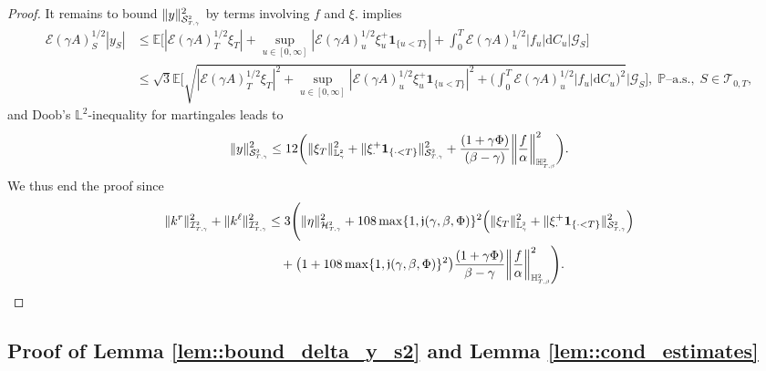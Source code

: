 \documentclass[10pt]{article} %
\newcommand\cE{\mathcal E}
\newcommand\cG{\mathcal G}
\newcommand\cH{\mathcal H}
\newcommand\cI{\mathcal I}
\newcommand\cS{\mathcal S}
\newcommand\cT{\mathcal T}
\newcommand{\smalltext}[1]{\text{\fontsize{4}{4}\selectfont$#1$}}
\def \E{\mathbb{E}}
\def \H{\mathbb{H}}
\def \L{\mathbb{L}}
\def \P{\mathbb{P}}
\def\d{\mathrm{d}}
\begin{document}
\begin{proof}
	It remains to bound $\|y\|^2_{\cS^\smalltext{2}_{\smalltext{T}\smalltext{,}\smalltext{\gamma}}}$ by terms involving $f$ and $\xi$.  implies
	\begin{align*}
		\cE(\gamma A)^{1/2}_S |y_S| 
		&\leq \E\bigg[ |\cE(\gamma A)^{1/2}_T\xi_T| + \sup_{u \in [0,\infty]}|\cE(\gamma A)^{1/2}_u \xi^+_u\mathbf{1}_{\{u < T\}}| + \int_0^T\cE(\gamma A)^{1/2}_u |f_u|\d C_u \bigg| \cG_S\bigg] \\
		&\leq \sqrt{3}\E\Bigg[ \sqrt{|\cE(\gamma A)^{1/2}_T\xi_T|^2 + \sup_{u \in [0,\infty]}|\cE(\gamma A)^{1/2}_u \xi^+_u\mathbf{1}_{\{u < T\}}|^2 + \bigg(\int_0^T\cE(\gamma A)^{1/2}_u |f_u|\d C_u\bigg)^2} \Bigg| \cG_S\Bigg], \; \text{$\P$--a.s.}, \; S \in \cT_{0,T},
	\end{align*}
	and Doob's $\L^2$-inequality for martingales leads to
	\begin{equation*}
		\|y\|^2_{\cS^\smalltext{2}_{\smalltext{T}\smalltext{,}\smalltext{\gamma}}} \leq 12 \bigg( \|\xi_T\|^2_{\L^\smalltext{2}_\smalltext{\gamma}} + \|\xi^+_\cdot\mathbf{1}_{\{\cdot < T\}}\|^2_{\cS^\smalltext{2}_{\smalltext{T}\smalltext{,}\smalltext{\gamma}}} + \frac{(1+\gamma\Phi)}{(\beta-\gamma)}\bigg\|\frac{f}{\alpha}\bigg\|^2_{\H^\smalltext{2}_{\smalltext{T}\smalltext{,}\smalltext{\beta}}} \bigg).
	\end{equation*}
	We thus end the proof since
	\begin{align*}
		\|k^r\|^2_{\cI^\smalltext{2}_{\smalltext{T}\smalltext{,}\smalltext{\gamma}}} + \|k^\ell\|^2_{\cI^\smalltext{2}_{\smalltext{T}\smalltext{,}\smalltext{\gamma}}} 
		&\leq 3 \Bigg( \|\eta\|^2_{\cH^\smalltext{2}_{\smalltext{T}\smalltext{,}\smalltext{\gamma}}} + 108 \max\{1, \mathfrak{j}(\gamma,\beta,\Phi)\}^2\Big(\|\xi_T\|^2_{\L^\smalltext{2}_\smalltext{\gamma}} + \|\xi^+_\cdot\mathbf{1}_{\{\cdot < T\}}\|^2_{\cS^\smalltext{2}_{\smalltext{T}\smalltext{,}\smalltext{\gamma}}} \Big) \\
		&\quad + \big(1+ 108 \max\{1, \mathfrak{j}(\gamma,\beta,\Phi)\}^2\big)\frac{(1+\gamma\Phi)}{\beta-\gamma}\bigg\|\frac{f}{\alpha}\bigg\|^2_{\H^\smalltext{2}_{\smalltext{T}\smalltext{,}\smalltext{\beta}}} \Bigg).
	\end{align*}
\end{proof}



\subsection{Proof of Lemma \ref{lem::bound_delta_y_s2} and Lemma \ref{lem::cond_estimates}}\label{subsec::proofs_tech_lemmas}
\end{document}
